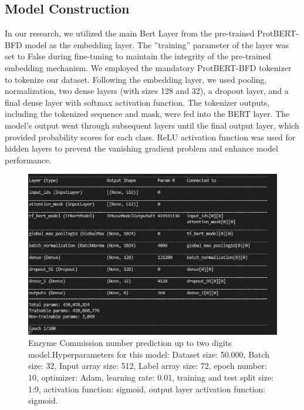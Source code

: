 \documentclass[conference]{IEEEtran}
\begin{document}
\subsection{Model Construction}


In our research, we utilized the main Bert Layer from the pre-trained ProtBERT-BFD
model as the embedding layer. The ”training” parameter of the layer was set to False
during fine-tuning to maintain the integrity of the pre-trained embedding mechanism. We
employed the mandatory ProtBERT-BFD tokenizer to tokenize our dataset. Following
the embedding layer, we used pooling, normalization, two dense layers (with sizes 128
and 32), a dropout layer, and a final dense layer with softmax activation function. The
tokenizer outputs, including the tokenized sequence and mask, were fed into the BERT
layer. The model’s output went through subsequent layers until the final output layer,
which provided probability scores for each class. ReLU activation function was used for
hidden layers to prevent the vanishing gradient problem and enhance model performance.


\begin{figure}[htp!]
  \centering
  \includegraphics[width=1\linewidth]{images/Model_0001.jpg}
  \caption{Enzyme Commission number prediction up to two digits model.Hyperparameters for this model: Dataset size:
  50.000, Batch size: 32, Input array size: 512, Label array size: 72, epoch number: 10, optimizer:
  Adam, learning rate: 0.01, training and test split size: 1:9, activation function: sigmoid, output layer
  activation function: sigmoid.}
  \label{fig:model}
\end{figure}
\end{document}
